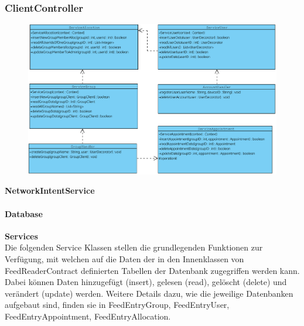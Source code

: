 \subsubsection{ClientController}
\begin{figure}[H]
	\includegraphics[scale = .5]{res/umlDiagramms/clientControllerDatabase.pdf}
	\centering
\end{figure}

\textbf{NetworkIntentService}

\paragraph{Database}

\textbf{Services}\\
Die folgenden Service Klassen stellen die grundlegenden Funktionen zur Verfügung, mit welchen auf die Daten der in den Innenklassen von FeedReaderContract definierten Tabellen der Datenbank zugegriffen werden kann. Dabei können Daten hinzugefügt (insert), gelesen (read), gelöscht (delete) und verändert (update) werden.
Weitere Details dazu, wie die jeweilige Datenbanken aufgebaut sind, finden sie in FeedEntryGroup, FeedEntryUser, FeedEntryAppointment, FeedEntryAllocation.

